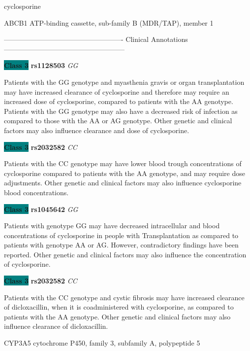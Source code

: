 \documentclass{resume} %
\begin{document}
\begin{rSection}{ cyclosporine }
\begin{rSubsection}{ ABCB1 }{ ATP-binding cassette, sub-family B (MDR/TAP), member 1 }{}{}
\item[] ---------------------------------------------------- Clinical Annotations -----------------------------------------------------\newline
\item \textbf{\colorbox{teal} {Class 3}} \textbf{ rs1128503 } \textit{ GG }
\item[] Patients with the GG genotype and myasthenia gravis or organ transplantation may have increased clearance of cyclosporine and therefore may require an increased dose of cyclosporine, compared to patients with the AA genotype. Patients with the GG genotype may also have a decreased risk of infection as compared to those with the AA or AG genotype. Other genetic and clinical factors may also influence clearance and dose of cyclosporine.\item \textbf{\colorbox{teal} {Class 3}} \textbf{ rs2032582 } \textit{ CC }
\item[] Patients with the CC genotype may have lower blood trough concentrations of cyclosporine compared to patients with the AA genotype, and may require dose adjustments. Other genetic and clinical factors may also influence cyclosporine blood concentrations.\item \textbf{\colorbox{teal} {Class 3}} \textbf{ rs1045642 } \textit{ GG }
\item[] Patients with genotype GG may have decreased intracellular and blood concentrations of cyclosporine in people with Transplantation as compared to patients with genotype AA or AG. However, contradictory findings have been reported. Other genetic and clinical factors may also influence the concentration of cyclosporine.\item \textbf{\colorbox{teal} {Class 3}} \textbf{ rs2032582 } \textit{ CC }
\item[] Patients with the CC genotype and cystic fibrosis may have increased clearance of dicloxacillin, when it is coadministered with cyclosporine, as compared to patients with the AA genotype. Other genetic and clinical factors may also influence clearance of dicloxacillin.
\end{rSubsection}\begin{rSubsection}{ CYP3A5 }{ cytochrome P450, family 3, subfamily A, polypeptide 5 }{}{}
\item[]


\end{rSubsection}
\end{rSection}
\end{document}
